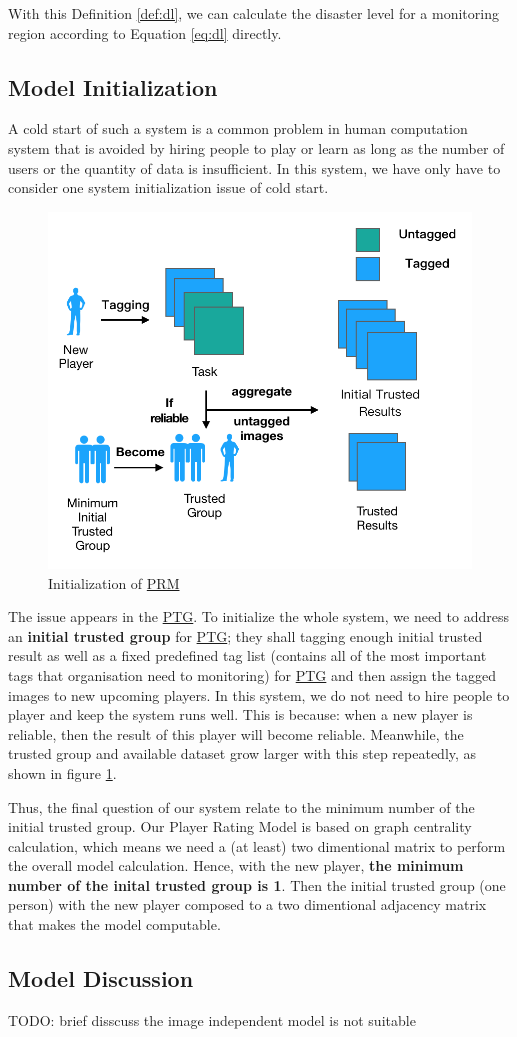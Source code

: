 With this Definition \ref{def:dl}, we can calculate the disaster level for a monitoring region 
according to Equation \ref{eq:dl} directly.

\subsection{Model Initialization}
\label{chapter:modelinit}

A cold start of such a system is a common problem in human computation system that 
is avoided by hiring people to play or learn as long as 
the number of users or the quantity of data is insufficient.
In this system, we have only have to consider one system initialization issue of cold start.

\begin{figure}[htp]
\centering
\includegraphics[width=0.5\columnwidth]{figures/coldstart2}
\caption{Initialization of \hyperref[idx:prm]{PRM}}
\label{fig:cold}
\end{figure}

The issue appears in the \hyperref[idx:ptg]{PTG}. 
To initialize the whole system, we need to address an \textbf{initial trusted group} for \hyperref[idx:ptg]{PTG}; 
they shall tagging enough initial trusted result as well as a fixed predefined tag list 
(contains all of the most important tags that organisation need to monitoring)
for \hyperref[idx:ptg]{PTG} and then assign the tagged images to new upcoming players. 
In this system, we do not need to hire people to player and keep the system runs well. This is because: 
when a new player is reliable, then the result of this player will become reliable. 
Meanwhile, the trusted group and available dataset grow larger with this step repeatedly, 
as shown in figure \ref{fig:cold}.

Thus, the final question of our system relate to the minimum number of the initial trusted group.
Our Player Rating Model is based on graph centrality calculation, which means we need a (at least) two dimentional matrix
to perform the overall model calculation. Hence, with the new player, \textbf{the minimum number of the inital trusted group is 1}.
Then the initial trusted group (one person) with the new player composed to a two dimentional adjacency matrix that makes the model
computable.

\subsection{Model Discussion}

TODO: brief disscuss the image independent model is not suitable